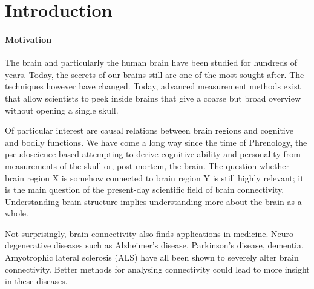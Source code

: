 \documentclass[a4paper, 10pt, english, twocolumn]{article}
\title{\fontfamily{phv}\selectfont{Causal Discovery methods for Effective Connectivity}}
\author{
  \textbf{R. Janssen} - \href{mailto:ramon.janssen@student.ru.nl}{ramon.janssen@student.ru.nl} \\
  \textbf{T. de Ruijter} - \href{mailto:t.deruijter@student.ru.nl}{t.deruijter@student.ru.nl}\\
  \textbf{T. Claassen} - \href{mailto:tomc@cs.ru.nl}{tomc@cs.ru.nl}\\
  \textbf{M. Hinne} - \href{mailto:mhinne@cs.ru.nl}{mhinne@cs.ru.nl}\\
}
\date{\fontfamily{ptm}\selectfont{\small{\bfseries{\today - Radboud
Universiteit Nijmegen}}}\\[0.5cm]\rule{\linewidth}{0.3mm}}
\newcommand{\keywords}[1]{\par\noindent 
{\bf Keywords\/}. #1}
\begin{document}
\maketitle

\begin{abstract}
Lorem Ipsum Dolor Sit Amet.
\keywords{Keywords}
\end{abstract}

\setlength{\parindent}{0.0cm}
\setlength{\parskip}{0.25cm}

\section{Introduction}


\paragraph{Motivation}
The brain and particularly the human brain have been studied for hundreds of years.
Today, the secrets of our brains still are one of the most sought-after.
The techniques however have changed.
Today, advanced measurement methods exist that allow scientists to peek inside brains that give a coarse but broad overview without opening a single skull.

Of particular interest are causal relations between brain regions and cognitive and bodily functions.
We have come a long way since the time of Phrenology, the pseudoscience based attempting to derive cognitive ability and personality from measurements of the skull or, post-mortem, the brain.
The question whether brain region X is somehow connected to brain region Y is still highly relevant; it is the main question of the present-day scientific field of brain connectivity.
Understanding brain structure implies understanding more about the brain as a whole.

Not surprisingly, brain connectivity also finds applications in medicine.
Neuro-degenerative diseases such as Alzheimer's disease, Parkinson's disease, dementia, Amyotrophic lateral sclerosis (ALS) have all been shown to severely alter brain connectivity. %
Better methods for analysing connectivity could lead to more insight in these diseases.
\end{document}
